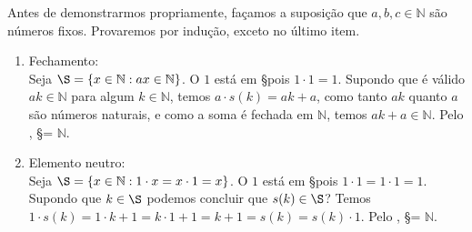 \documentclass[../main.tex]{subfiles}
\begin{document}
\begin{dem}
    Antes de demonstrarmos propriamente, façamos a suposição que $a,b,c \in \mathbb{N}$ são números fixos. Provaremos por indução, exceto no último item.
    \begin{enumerate}[label=(\roman*)]
        \item Fechamento: \\
            Seja $\S = \{x \in \mathbb{N} : ax \in \mathbb{N} \}$.
            O $1$ está em \S pois $1 \cdot 1 = 1$. Supondo que é válido $ak \in \mathbb{N}$ para algum $k \in \mathbb{N}$, temos $a \cdot s(k) = ak + a$, como tanto $ak$ quanto $a$ são números naturais, e como a soma é fechada em $\mathbb{N}$, temos $ak + a \in \mathbb{N}$. Pelo , \S = $\mathbb{N}$. 
        \item Elemento neutro: \\
            Seja $\S = \{ x \in \mathbb{N} : 1 \cdot x = x \cdot 1  = x \}$. O $1$ está em \S pois $1 \cdot 1 = 1 \cdot 1 = 1$. Supondo que $k \in \S$ podemos concluir que $s(k) \in \S$?
            Temos $1 \cdot s(k) = 1 \cdot k + 1 = k \cdot 1 + 1 = k + 1 = s(k) = s(k) \cdot 1$. Pelo , \S = $\mathbb{N}$.
            

\end{enumerate}
\end{dem}
\end{document}
